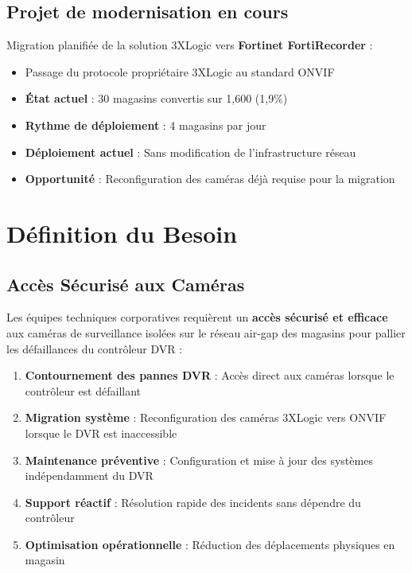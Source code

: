 \documentclass{dollarama}
\begin{document}
\subsection{Projet de modernisation en cours}

Migration planifiée de la solution 3XLogic vers \textbf{Fortinet FortiRecorder} :
\begin{itemize}
\item Passage du protocole propriétaire 3XLogic au standard ONVIF
\item \textbf{État actuel} : 30 magasins convertis sur 1,600 (1,9\%)
\item \textbf{Rythme de déploiement} : 4 magasins par jour
\item \textbf{Déploiement actuel} : Sans modification de l'infrastructure réseau
\item \textbf{Opportunité} : Reconfiguration des caméras déjà requise pour la migration
\end{itemize}


\section{Définition du Besoin}

\subsection{Accès Sécurisé aux Caméras}

Les équipes techniques corporatives requièrent un \textbf{accès sécurisé et efficace} aux caméras de surveillance isolées sur le réseau air-gap des magasins pour pallier les défaillances du contrôleur DVR :

\begin{enumerate}
\item \textbf{Contournement des pannes DVR} : Accès direct aux caméras lorsque le contrôleur est défaillant
\item \textbf{Migration système} : Reconfiguration des caméras 3XLogic vers ONVIF lorsque le DVR est inaccessible
\item \textbf{Maintenance préventive} : Configuration et mise à jour des systèmes indépendamment du DVR
\item \textbf{Support réactif} : Résolution rapide des incidents sans dépendre du contrôleur
\item \textbf{Optimisation opérationnelle} : Réduction des déplacements physiques en magasin
\end{enumerate}
\end{document}
